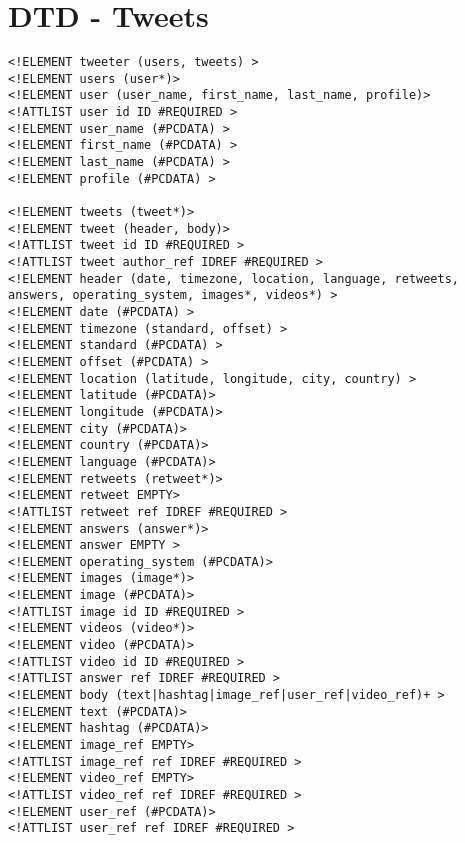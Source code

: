 \chapter{DTD - Tweets}
\begin{verbatim}
<!ELEMENT tweeter (users, tweets) >
<!ELEMENT users (user*)>
<!ELEMENT user (user_name, first_name, last_name, profile)>
<!ATTLIST user id ID #REQUIRED >
<!ELEMENT user_name (#PCDATA) >
<!ELEMENT first_name (#PCDATA) >
<!ELEMENT last_name (#PCDATA) >
<!ELEMENT profile (#PCDATA) >

<!ELEMENT tweets (tweet*)>
<!ELEMENT tweet (header, body)>
<!ATTLIST tweet id ID #REQUIRED >
<!ATTLIST tweet author_ref IDREF #REQUIRED >
<!ELEMENT header (date, timezone, location, language, retweets, answers, operating_system, images*, videos*) >
<!ELEMENT date (#PCDATA) >
<!ELEMENT timezone (standard, offset) >
<!ELEMENT standard (#PCDATA) >
<!ELEMENT offset (#PCDATA) >
<!ELEMENT location (latitude, longitude, city, country) >
<!ELEMENT latitude (#PCDATA)>
<!ELEMENT longitude (#PCDATA)>
<!ELEMENT city (#PCDATA)>
<!ELEMENT country (#PCDATA)>
<!ELEMENT language (#PCDATA)>
<!ELEMENT retweets (retweet*)>
<!ELEMENT retweet EMPTY>
<!ATTLIST retweet ref IDREF #REQUIRED >
<!ELEMENT answers (answer*)>
<!ELEMENT answer EMPTY >
<!ELEMENT operating_system (#PCDATA)>
<!ELEMENT images (image*)>
<!ELEMENT image (#PCDATA)>
<!ATTLIST image id ID #REQUIRED >
<!ELEMENT videos (video*)>
<!ELEMENT video (#PCDATA)>
<!ATTLIST video id ID #REQUIRED >
<!ATTLIST answer ref IDREF #REQUIRED >
<!ELEMENT body (text|hashtag|image_ref|user_ref|video_ref)+ >
<!ELEMENT text (#PCDATA)>
<!ELEMENT hashtag (#PCDATA)>
<!ELEMENT image_ref EMPTY>
<!ATTLIST image_ref ref IDREF #REQUIRED >
<!ELEMENT video_ref EMPTY>
<!ATTLIST video_ref ref IDREF #REQUIRED >
<!ELEMENT user_ref (#PCDATA)>
<!ATTLIST user_ref ref IDREF #REQUIRED >
\end{verbatim}
